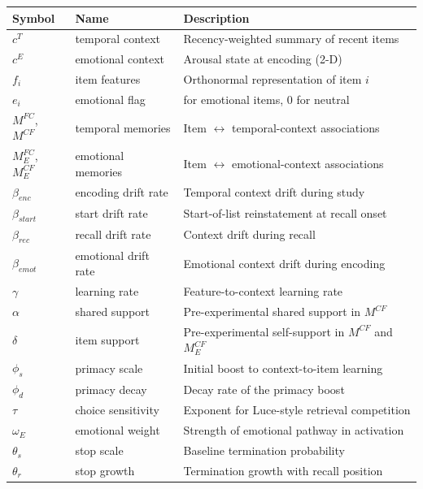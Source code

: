 \documentclass[
  man,
  floatsintext,
  longtable,
  nolmodern,
  notxfonts,
  notimes,
  draftfirst,
  colorlinks=true,linkcolor=blue,citecolor=blue,urlcolor=blue]{apa7}
\begin{document}
\begin{table}
\begin{longtable}[]{@{}
  >{\raggedright\arraybackslash}p{}
  >{\raggedright\arraybackslash}p{}
  >{\raggedright\arraybackslash}p{}@{}}
\toprule\noalign{}
\begin{minipage}[b]{\linewidth}\raggedright
Symbol
\end{minipage} & \begin{minipage}[b]{\linewidth}\raggedright
Name
\end{minipage} & \begin{minipage}[b]{\linewidth}\raggedright
Description
\end{minipage} \\
\midrule\noalign{}
\endhead
\bottomrule\noalign{}
\endlastfoot
\(c^T\) & temporal context & Recency-weighted summary of recent items \\
\(c^E\) & emotional context & Arousal state at encoding (2-D) \\
\(f_i\) & item features & Orthonormal representation of item \(i\) \\
\(e_i\) & emotional flag & 1 for emotional items, 0 for neutral \\
\(M^{FC}\), \(M^{CF}\) & temporal memories & Item \(\leftrightarrow\)
temporal-context associations \\
\(M^{FC}_E\), \(M^{CF}_E\) & emotional memories & Item
\(\leftrightarrow\) emotional-context associations \\
\(\beta_{enc}\) & encoding drift rate & Temporal context drift during
study \\
\(\beta_{start}\) & start drift rate & Start-of-list reinstatement at
recall onset \\
\(\beta_{rec}\) & recall drift rate & Context drift during recall \\
\(\beta_{emot}\) & emotional drift rate & Emotional context drift during
encoding \\
\(\gamma\) & learning rate & Feature-to-context learning rate \\
\(\alpha\) & shared support & Pre-experimental shared support in
\(M^{CF}\) \\
\(\delta\) & item support & Pre-experimental self-support in \(M^{CF}\)
and \(M^{CF}_E\) \\
\(\phi_s\) & primacy scale & Initial boost to context-to-item
learning \\
\(\phi_d\) & primacy decay & Decay rate of the primacy boost \\
\(\tau\) & choice sensitivity & Exponent for Luce-style retrieval
competition \\
\(\omega_E\) & emotional weight & Strength of emotional pathway in
activation \\
\(\theta_s\) & stop scale & Baseline termination probability \\
\(\theta_r\) & stop growth & Termination growth with recall position \\
\end{longtable}

\end{table}
\end{document}
